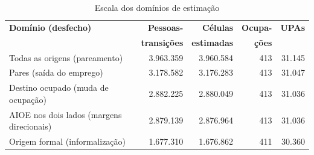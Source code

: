 \begin{table}[htb]
  \caption{Escala dos domínios de estimação}
  \label{tab:escala}
  \centering
  \espacosimples\idpcorpodez
  \begin{tabular}{@{}lrrrr@{}}
    \toprule
    \textbf{Domínio (desfecho)}                & \textbf{Pessoas-} & \textbf{Células} & \textbf{Ocupa-} & \textbf{UPAs} \\
                                               & \textbf{transições} & \textbf{estimadas} & \textbf{ções} & \\
    \midrule
    Todas as origens (pareamento)              & 3.963.359    & 3.960.584    & 413        & 31.145 \\
    Pares (saída do emprego)                   & 3.178.582    & 3.176.283    & 413        & 31.047 \\
    Destino ocupado (muda de ocupação)         & 2.882.225    & 2.880.049    & 413        & 31.036 \\
    AIOE nos dois lados (margens direcionais)  & 2.879.139    & 2.876.964    & 413        & 31.036 \\
    Origem formal (informalização)             & 1.677.310    & 1.676.862    & 411        & 30.360 \\
    \bottomrule
  \end{tabular}
\end{table}
